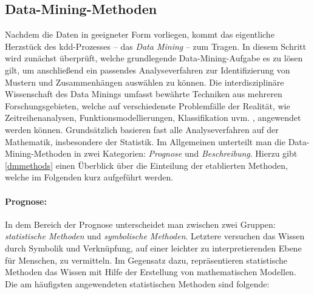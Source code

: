 \newpage
\subsection{Data-Mining-Methoden}
\label{dmmethoden}

Nachdem die Daten in geeigneter Form vorliegen, kommt das eigentliche Herzstück des \gls{kdd}-Prozesses -- das \textit{Data Mining} -- zum Tragen. In diesem Schritt wird zunächst überprüft, welche grundlegende Data-Mining-Aufgabe es zu lösen gilt, um anschließend ein passendes Analyseverfahren zur Identifizierung von Mustern und Zusammenhängen auswählen zu können. Die interdisziplinäre Wissenschaft des Data Minings umfasst bewährte Techniken aus mehreren Forschungsgebieten, welche auf verschiedenste Problemfälle der Realität, wie Zeitreihenanalysen, Funktionsmodellierungen, Klassifikation uvm. , angewendet werden können. Grundsätzlich basieren fast alle Analyseverfahren auf der Mathematik, insbesondere der Statistik. Im Allgemeinen unterteilt man die Data-Mining-Methoden in zwei Kategorien: \textit{Prognose} und \textit{Beschreibung}. Hierzu gibt \vref{dmmethods} einen Überblick über die Einteilung der etablierten Methoden, welche im Folgenden kurz aufgeführt werden.

\paragraph{Prognose:} In dem Bereich der Prognose unterscheidet man zwischen zwei Gruppen: \textit{statistische Methoden} und \textit{symbolische Methoden}. Letztere versuchen das Wissen durch Symbolik und Verknüpfung, auf einer leichter zu interpretierenden Ebene für Menschen, zu vermitteln. Im Gegensatz dazu, repräsentieren statistische Methoden das Wissen mit Hilfe der Erstellung von mathematischen Modellen. Die am häufigsten angewendeten statistischen Methoden sind folgende:

